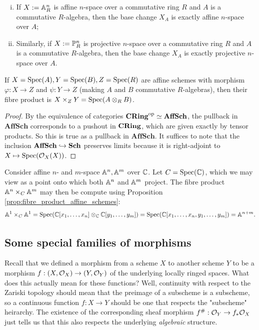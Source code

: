 \begin{eg}
	\begin{enumerate}[(i)]
		\item If $X:=\mathbb{A}^n_{R}$ is affine $n$-space over a commutative ring $R$ and $A$ is a commutative $R$-algebra, then the base change $X_A$ is exactly affine $n$-space over $A$;
		\item Similarly, if $X := \mathbb{P}^n_{R}$ is projective $n$-space over a commutative ring $R$ and $A$ is a commutative $R$-algebra, then the base change $X_A$ is exactly projective $n$-space over $A$.
	\end{enumerate}
\end{eg}

\begin{prop}
	\label{prop:fibre_product_affine_schemes}
	If $X = \mathrm{Spec}(A), Y = \mathrm{Spec}(B), Z=\mathrm{Spec}(R)$ are affine schemes with morphism $\varphi : X \to Z$ and $\psi : Y \to Z$ (making $A$ and $B$ commutative $R$-algebras), then their fibre product is $X \times_Z Y = \mathrm{Spec}(A \otimes_R B)$.
\end{prop}
\begin{proof}
	By the equivalence of categories $\mathbf{CRing}^\text{op} \simeq \mathbf{AffSch}$, the pullback in $\mathbf{AffSch}$ corresponds to a pushout in $\mathbf{CRing}$, which are given exactly by tensor products. So this is true as a pullback in $\mathbf{AffSch}$. It suffices to note that the inclusion $\mathbf{AffSch} \hookrightarrow \mathbf{Sch}$ preserves limits because it is right-adjoint to $X \mapsto \mathrm{Spec}(\mathcal{O}_X(X))$.
\end{proof}

\begin{eg}
	Consider affine $n$- and $m$-space $\mathbb{A}^n, \mathbb{A}^m$ over $\mathbb{C}$. Let $C = \mathrm{Spec}(\mathbb{C})$, which we may view as a point onto which both $\mathbb{A}^n$ and $\mathbb{A}^m$ project. The fibre product $\mathbb{A}^n \times_C \mathbb{A}^m$ may then be compute using Proposition \ref{prop:fibre_product_affine_schemes}: 
	\[
		\mathbb{A}^1 \times_C \mathbb{A}^1 = \mathrm{Spec}(\mathbb{C}[x_1, \ldots, x_n] \otimes_{\mathbb{C}} \mathbb{C}[y_1, \ldots, y_m]) = \mathrm{Spec}(\mathbb{C}[x_1, \ldots, x_n, y_1, \ldots, y_m]) = \mathbb{A}^{n+m}. \qedhere
	\]
\end{eg}

\subsection{Some special families of morphisms}
\label{subsec:2_4_families_of_morphisms}
Recall that we defined a morphism from a scheme $X$ to another scheme $Y$ to be a morphism $f:(X, \mathcal{O}_X) \to (Y, \mathcal{O}_Y)$ of the underlying locally ringed spaces. What does this actually mean for these functions? Well, continuity with respect to the Zariski topology should mean that the preimage of a subscheme is a subscheme, so a continuous function $f:X \to Y$ should be one that respects the "subscheme" heirarchy. The existence of the corresponding sheaf morphism $f^{\#} : \mathcal{O}_Y \to f_*\mathcal{O}_X$ just tells us that this also respects the underlying \emph{algebraic} structure.\\ 

